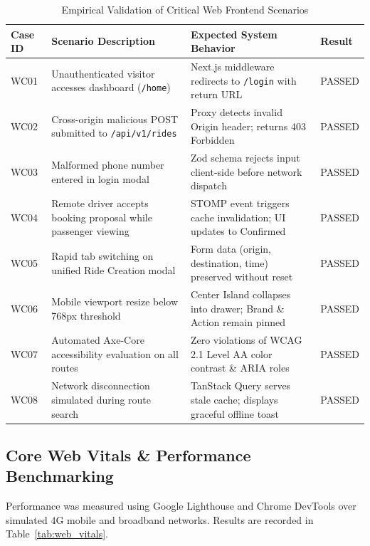 \documentclass[conference,10pt,a4paper]{IEEEtran}
\begin{document}
\begin{table}[!t]
\caption{Empirical Validation of Critical Web Frontend Scenarios}
\label{tab:web_test_cases}
\centering
\scriptsize
\begin{tabularx}{\textwidth}{lp{5.5cm}Xl}
\toprule
\textbf{Case ID} & \textbf{Scenario Description} & \textbf{Expected System Behavior} & \textbf{Result} \\
\midrule
WC01 & Unauthenticated visitor accesses dashboard (\texttt{/home}) & Next.js middleware redirects to \texttt{/login} with return URL & PASSED \\
WC02 & Cross-origin malicious POST submitted to \texttt{/api/v1/rides} & Proxy detects invalid Origin header; returns 403 Forbidden & PASSED \\
WC03 & Malformed phone number entered in login modal & Zod schema rejects input client-side before network dispatch & PASSED \\
WC04 & Remote driver accepts booking proposal while passenger viewing & STOMP event triggers cache invalidation; UI updates to Confirmed & PASSED \\
WC05 & Rapid tab switching on unified Ride Creation modal & Form data (origin, destination, time) preserved without reset & PASSED \\
WC06 & Mobile viewport resize below 768px threshold & Center Island collapses into drawer; Brand \& Action remain pinned & PASSED \\
WC07 & Automated Axe-Core accessibility evaluation on all routes & Zero violations of WCAG 2.1 Level AA color contrast \& ARIA roles & PASSED \\
WC08 & Network disconnection simulated during route search & TanStack Query serves stale cache; displays graceful offline toast & PASSED \\
\bottomrule
\end{tabularx}
\end{table}

\subsection{Core Web Vitals \& Performance Benchmarking}
Performance was measured using Google Lighthouse and Chrome DevTools over simulated 4G mobile and broadband networks. Results are recorded in Table~\ref{tab:web_vitals}.
\end{document}
